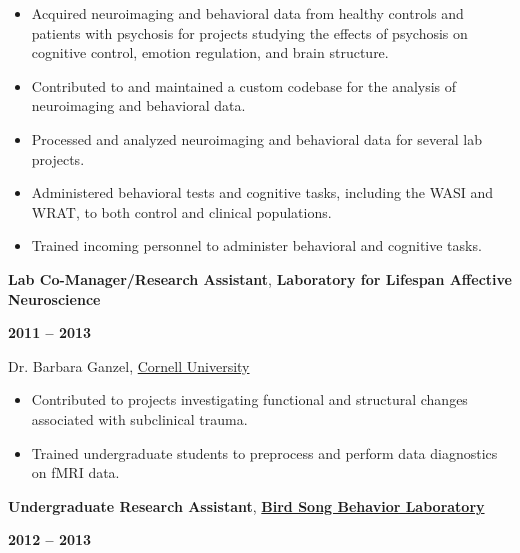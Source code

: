 \documentclass[10pt]{article}
\begin{document}
\begin{itemize}[noitemsep, nolistsep]
\item
  Acquired neuroimaging and behavioral data from healthy controls and
  patients with psychosis for projects studying the effects of psychosis
  on cognitive control, emotion regulation, and brain structure.
\item
  Contributed to and maintained a custom codebase for the analysis of
  neuroimaging and behavioral data.
\item
  Processed and analyzed neuroimaging and behavioral data for several
  lab projects.
\item
  Administered behavioral tests and cognitive tasks, including the WASI
  and WRAT, to both control and clinical populations.
\item
  Trained incoming personnel to administer behavioral and cognitive
  tasks.
\end{itemize}

\bigskip

\begin{minipage}[t]{.85\linewidth}
	\flushleft
	\noindent
	\textbf{Lab Co-Manager/Research Assistant},
	\textbf{Laboratory for Lifespan Affective Neuroscience}
	\end{minipage}
	\hfill
	\begin{minipage}[t]{.15\linewidth}
	\flushright
	\noindent
	\textsc{\textbf{2011 -- 2013}}
\end{minipage}

Dr. Barbara Ganzel,
\href{http://www.cornell.edu}{Cornell University}

\begin{itemize}[noitemsep, nolistsep]
\item
  Contributed to projects investigating functional and structural
  changes associated with subclinical trauma.
\item
  Trained undergraduate students to preprocess and perform data
  diagnostics on fMRI data.
\end{itemize}

\bigskip

\begin{minipage}[t]{.85\linewidth}
	\flushleft
	\noindent
	\textbf{Undergraduate Research Assistant},
	\href{http://people.psych.cornell.edu/~devoogdlab/}{\textbf{Bird Song Behavior Laboratory}}
	\end{minipage}
	\hfill
	\begin{minipage}[t]{.15\linewidth}
	\flushright
	\noindent
	\textsc{\textbf{2012 -- 2013}}
\end{minipage}
\end{document}
